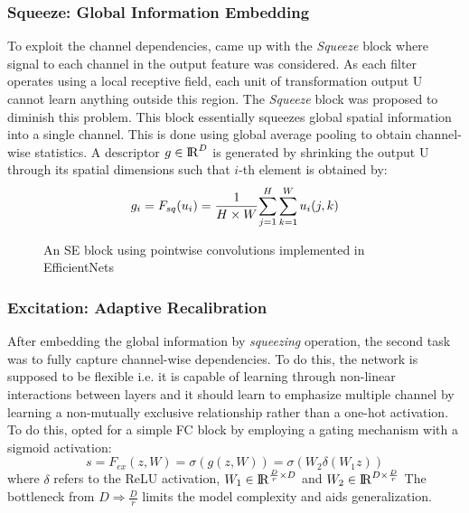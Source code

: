 \documentclass[fleqn,usenatbib]{mnras}
\begin{document}
\subsubsection{Squeeze: Global Information Embedding}
\hspace{0.25 in}To exploit the channel dependencies, \citet{hu2018squeeze} came up with the \textit{Squeeze} block where signal to each channel in the output feature was considered. As each filter operates using a local receptive field, each unit of transformation output U cannot learn anything outside this region. The \textit{Squeeze} block was proposed to diminish this problem. This block essentially squeezes global spatial information into a single channel. This is done using global average pooling to obtain channel-wise statistics. A descriptor $g \in {\rm I\!R}^D$ is generated by shrinking the output U through its spatial dimensions such that $i$-th element is obtained by:
\begin{equation}
    \centering
    g_i = F_{sq}(u_i) = \frac{1}{H \times W} {\sum_{j=1}^{H}\sum_{k=1}^{W}u_i(j,k)}
\end{equation}
\begin{figure}
    \centering
    
    \caption{An SE block using pointwise convolutions implemented in EfficientNets}
    \label{SE Block}
\end{figure}
\subsubsection{Excitation: Adaptive Recalibration}
\hspace{0.25 in}After embedding the global information by \textit{squeezing} operation, the second task was to fully capture channel-wise dependencies. To do this, the network is supposed to be flexible i.e. it is capable of learning through non-linear interactions between layers and it should learn to emphasize multiple channel by learning a non-mutually exclusive relationship rather than a one-hot activation. To do this, \citet{hu2018squeeze} opted for a simple FC block by employing a gating mechanism with a sigmoid activation:
\begin{equation}
    s = F_{ex}(z, W) = \sigma(g(z, W)) = \sigma(W_2 \delta(W_1z))
\end{equation}
where $\delta$ refers to the ReLU activation, $W_1 \in {\rm I\!R}^{\frac{D}{r} \times D}$ and $W_2 \in {\rm I\!R}^{D \times \frac{D}{r}}$ The bottleneck from $D\Rightarrow \frac{D}{r}$ limits the model complexity and aids generalization.
\end{document}
